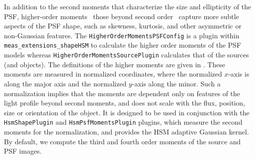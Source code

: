 In addition to the second moments that characterize the size and ellipticity of the PSF, higher-order moments \textemdash\ those beyond second order \textemdash\ capture more subtle aspects of the PSF shape, such as skewness, kurtosis, and other asymmetric or non-Gaussian features.
The \texttt{HigherOrderMomentsPSFConfig} is a plugin within \texttt{meas\_extensions\_shapeHSM} to calculate the higher order moments of the PSF models whereas \texttt{HigherOrderMomentsSourcePlugin} calculates that of the sources (and objects).
The definitions of the higher moments are given in \citet{2023MNRAS.520.2328Z}.
These moments are measured in normalized coordinates, where the normalized $x$-axis is along the major axis and the normalized $y$-axis along the minor.
Such a normalization implies that the moments are dependent only on features of the light profile beyond second moments, and does not scale with the flux, position, size or orientation of the object.
It is designed to be used in conjunction with the \texttt{HsmShapePlugin} and \texttt{HsmPsfMomentsPlugin} plugins, which measure the second moments for the normalization, and provides the HSM adaptive Gaussian kernel.
By default, we compute the third and fourth order moments of the source and PSF images.
